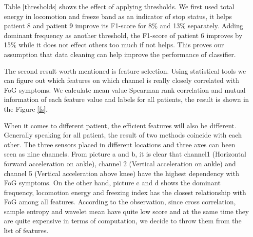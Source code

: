 \documentclass[article]{article}
\begin{document}
	Table \ref{thresholds} shows the effect of applying thresholds. We first used total energy in locomotion and freeze band as an indicator of stop status, it helps patient 8 and patient 9 improve its F1-score for 8\% and 13\% separately. Adding dominant frequency as another threshold, the F1-score of patient 6 improves by 15\% while it does not effect others too much if not helps. This proves our assumption that data cleaning can help improve the performance of classifier.
    
	The second result worth mentioned is feature selection. Using statistical tools we can figure out which features on which channel is really closely correlated with FoG symptoms.
    We calculate mean value Spearman rank correlation and mutual information of each feature value and labels for all patients, the result is shown in the Figure \ref{fs}. 
    
    When it comes to different patient, the efficient features will also be different. Generally speaking for all patient, the result of two methods coincide with each other. The three sensors placed in different locations and three axes can been seen as nine channels. From picture a and b, it is clear that channel1 (Horizontal forward acceleration on ankle), channel 2 (Vertical acceleration on ankle) and channel 5 (Vertical acceleration above knee) have the highest dependency with FoG symptoms. On the other hand, picture c and d shows the dominant frequency, locomotion energy and freezing index has the closest relationship with FoG among all features. According to the observation, since cross correlation, sample entropy and wavelet mean have quite low score and at the same time  they are quite expensive in terms of computation, we decide to throw them from the list of features.
    
\end{document}
